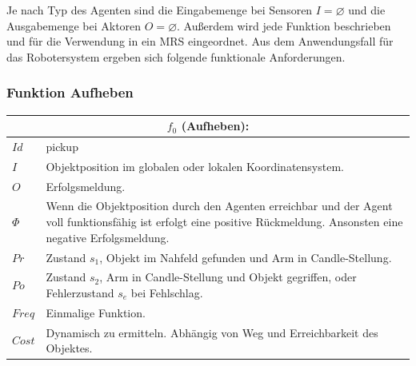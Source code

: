 Je nach Typ des Agenten sind die Eingabemenge bei Sensoren $I = \varnothing$ und die Ausgabemenge bei Aktoren $O =  \varnothing$. Außerdem wird jede Funktion beschrieben und für die Verwendung in ein MRS eingeordnet. Aus dem Anwendungsfall für das Robotersystem ergeben sich folgende funktionale Anforderungen.

\subsubsection{Funktion Aufheben}

\begin{tabular}{|p{3cm}|p{10cm}|}
	\multicolumn{2}{c}{	$f_0$ (Aufheben):}\\
	\hline  $Id$ & pickup\\ 
	\hline  $I$ & Objektposition im globalen oder lokalen Koordinatensystem. \\ 
	\hline  $O$ & Erfolgsmeldung. \\ 
	\hline  $\Phi$ & Wenn die Objektposition durch den Agenten erreichbar und der Agent voll funktionsfähig ist erfolgt eine positive Rückmeldung. Ansonsten eine negative Erfolgsmeldung.\\ 
	\hline $Pr$ & Zustand $s_1$, Objekt im Nahfeld gefunden und Arm in Candle-Stellung. \\ 
	\hline $Po$ & Zustand $s_2$, Arm in Candle-Stellung und Objekt gegriffen, oder Fehlerzustand $s_e$ bei Fehlschlag. \\ 
	\hline $Freq$ & Einmalige Funktion. \\ 
	\hline $Cost$ & Dynamisch zu ermitteln. Abhängig von Weg und Erreichbarkeit des Objektes. \\
	\hline
\end{tabular}

